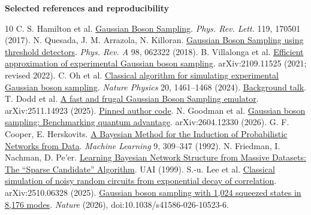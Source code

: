 \documentclass[11pt,letterpaper]{article}
\begin{document}
\vspace{2pt}
{\small\bfseries\color{ink}Selected references and reproducibility}\par
\begingroup
\fontsize{9.5}{10.9}\selectfont
\setlength{\parskip}{0pt}
\renewcommand{\section}[2]{}
\begin{thebibliography}{10}
\setlength{\itemsep}{1pt}
 C. S. Hamilton et al. \href{https://arxiv.org/abs/1612.01199}{Gaussian Boson Sampling}. \emph{Phys. Rev. Lett.} 119, 170501 (2017).
 N. Quesada, J. M. Arrazola, N. Killoran. \href{https://arxiv.org/abs/1807.01639}{Gaussian Boson Sampling using threshold detectors}. \emph{Phys. Rev. A} 98, 062322 (2018).
 B. Villalonga et al. \href{https://arxiv.org/abs/2109.11525}{Efficient approximation of experimental Gaussian boson sampling}. arXiv:2109.11525 (2021; revised 2022).
 C. Oh et al. \href{https://arxiv.org/abs/2306.03709}{Classical algorithm for simulating experimental Gaussian boson sampling}. \emph{Nature Physics} 20, 1461--1468 (2024). \href{https://www.youtube.com/watch?v=bHwmuqJxAS8}{Background talk}.
 T. Dodd et al. \href{https://arxiv.org/abs/2511.14923}{A fast and frugal Gaussian Boson Sampling emulator}. arXiv:2511.14923 (2025). \href{https://github.com/tomdodd4598/FrugalGBS/tree/fa8b796f2afebd4845a2e335e457735952617ef8}{Pinned author code}.
 N. Goodman et al. \href{https://arxiv.org/abs/2604.12330}{Gaussian boson sampling: Benchmarking quantum advantage}. arXiv:2604.12330 (2026).
 G. F. Cooper, E. Herskovits. \href{https://doi.org/10.1023/A:1022649401552}{A Bayesian Method for the Induction of Probabilistic Networks from Data}. \emph{Machine Learning} 9, 309--347 (1992).
 N. Friedman, I. Nachman, D. Pe'er. \href{https://arxiv.org/abs/1301.6696}{Learning Bayesian Network Structure from Massive Datasets: The ``Sparse Candidate'' Algorithm}. UAI (1999).
 S.-u. Lee et al. \href{https://arxiv.org/abs/2510.06328}{Classical simulation of noisy random circuits from exponential decay of correlation}. arXiv:2510.06328 (2025).
 \href{https://www.nature.com/articles/s41586-026-10523-6}{Gaussian boson sampling with 1,024 squeezed states in 8,176 modes}. \emph{Nature} (2026), doi:10.1038/s41586-026-10523-6.
\end{thebibliography}
\endgroup
\end{document}

